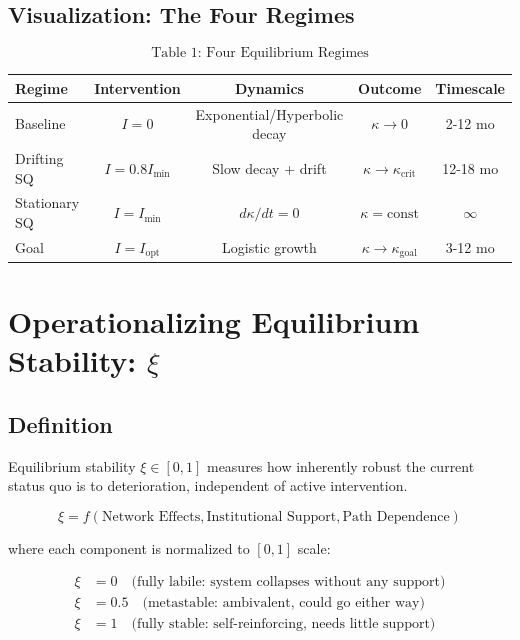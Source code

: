 \documentclass[11pt, a4paper]{article}
\begin{document}
\subsection{Visualization: The Four Regimes}

\begin{equation}
\text{Table 1: Four Equilibrium Regimes}
\end{equation}

\begin{center}
\begin{tabular}{|l|c|c|c|c|}
\hline
\textbf{Regime} & \textbf{Intervention} & \textbf{Dynamics} & \textbf{Outcome} & \textbf{Timescale} \\
\hline
Baseline & $I = 0$ & Exponential/Hyperbolic decay & $\kappa \to 0$ & 2-12 mo \\
Drifting SQ & $I = 0.8 I_{\min}$ & Slow decay + drift & $\kappa \to \kappa_{\text{crit}}$ & 12-18 mo \\
Stationary SQ & $I = I_{\min}$ & $d\kappa/dt = 0$ & $\kappa = \text{const}$ & $\infty$ \\
Goal & $I = I_{\text{opt}}$ & Logistic growth & $\kappa \to \kappa_{\text{goal}}$ & 3-12 mo \\
\hline
\end{tabular}
\end{center}


\section{Operationalizing Equilibrium Stability: $\xi$}

\subsection{Definition}

\begin{definition}
Equilibrium stability $\xi \in [0, 1]$ measures how inherently robust the current
status quo is to deterioration, independent of active intervention.

$$\xi = f(\text{Network Effects}, \text{Institutional Support}, \text{Path Dependence})$$

\vspace{0.5cm}
\noindent
where each component is normalized to $[0, 1]$ scale:

\begin{align}
\xi &= 0 \quad \text{(fully labile: system collapses without any support)} \\
\xi &= 0.5 \quad \text{(metastable: ambivalent, could go either way)} \\
\xi &= 1 \quad \text{(fully stable: self-reinforcing, needs little support)}
\end{align}
\end{definition}
\end{document}
